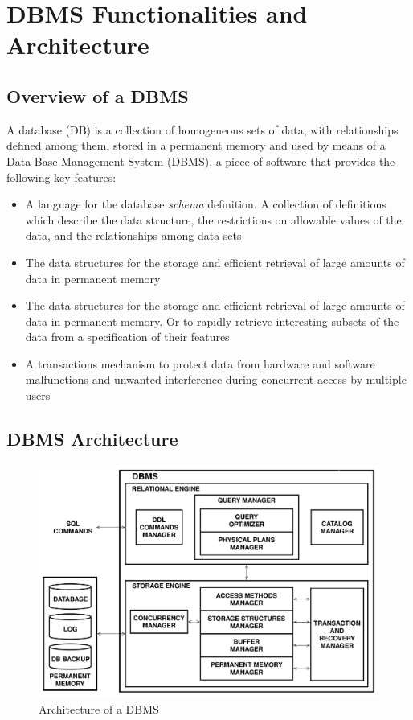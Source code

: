 \chapter{DBMS Functionalities and Architecture}
\section{Overview of a DBMS}
A database (DB) is a collection of homogeneous sets of data, with relationships defined among them, stored in a permanent memory and used by means of a  Data Base Management System (DBMS), a piece of software that provides the following key features:
\begin{itemize}
    \item A language for the database \textit{schema} definition. A collection of definitions which describe the data structure, the restrictions on allowable values of the data, and the relationships among data sets
    \item The data structures for the storage and efficient retrieval of large amounts of data in permanent memory
    \item The data structures for the storage and efficient retrieval of large amounts of data in permanent memory. Or to rapidly retrieve interesting subsets of the data from a specification of their features
    \item A transactions mechanism to protect data from hardware and software malfunctions and unwanted interference during concurrent access by multiple users
\end{itemize}

\newpage
\section{DBMS Architecture}
\begin{figure}[!h]
        \centering
        \includegraphics[width=0.7\linewidth]{images/DBMS_Internals/DBMS_architecture.jpeg}
        \caption{Architecture of a DBMS}
    \end{figure}

